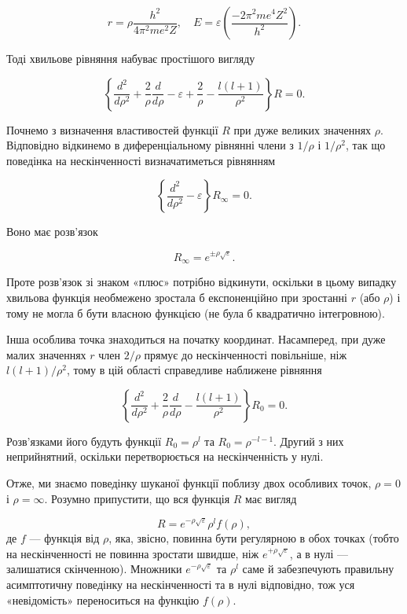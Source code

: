\documentclass{article}
\begin{document}
\begin{equation}
    r = \rho \frac{h^2}{4\pi^2 me^2 Z}, \quad E = \varepsilon \left( \frac{-2\pi^2 me^4 Z^2}{h^2} \right).
\end{equation}

Тоді хвильове рівняння набуває простішого вигляду

\begin{equation}
\left\{ \frac{d^2}{d\rho^2} + \frac{2}{\rho} \frac{d}{d\rho} - \varepsilon + \frac{2}{\rho} - \frac{l(l+1)}{\rho^2} \right\} R = 0.
\end{equation}

Почнемо з визначення властивостей функції $R$ при дуже великих значеннях $\rho$. Відповідно відкинемо в диференціальному рівнянні члени з $1/\rho$ і $1/\rho^2$, так що поведінка на нескінченності визначатиметься рівнянням

\begin{equation}
\left\{ \frac{d^2}{d\rho^2} - \varepsilon \right\} R_\infty = 0.
\end{equation}

Воно має розв'язок

\begin{equation}
R_\infty = e^{\pm \rho \sqrt{\varepsilon}}.
\end{equation}

Проте розв'язок зі знаком «плюс» потрібно відкинути, оскільки в цьому випадку хвильова функція необмежено зростала б експоненційно при зростанні $r$ (або $\rho$) і тому не могла б бути власною функцією (не була б квадратично інтегровною).

Інша особлива точка знаходиться на початку координат. Насамперед, при дуже малих значеннях $r$ член $2/\rho$ прямує до нескінченності повільніше, ніж $l(l+1)/\rho^2$, тому в цій області справедливе наближене рівняння

\begin{equation}
\left\{ \frac{d^2}{d\rho^2} + \frac{2}{\rho} \frac{d}{d\rho} - \frac{l(l+1)}{\rho^2} \right\} R_0 = 0.
\end{equation}

Розв'язками його будуть функції $R_0 = \rho^l$ та $R_0 = \rho^{-l-1}$. Другий з них неприйнятний, оскільки перетворюється на нескінченність у нулі.

Отже, ми знаємо поведінку шуканої функції поблизу двох особливих точок, $\rho = 0$ і $\rho = \infty$. Розумно припустити, що вся функція $R$ має вигляд

\begin{equation}
R = e^{-\rho \sqrt{\varepsilon}} \rho^l f(\rho),
\end{equation}
%
де $f$ --- функція від $\rho$, яка, звісно, повинна бути регулярною в обох точках (тобто на нескінченності не повинна зростати швидше, ніж $e^{+\rho \sqrt{\varepsilon}}$, а в нулі --- залишатися скінченною). Множники $e^{-\rho\sqrt\varepsilon}$ та $\rho^l$ саме й забезпечують правильну асимптотичну поведінку на нескінченності та в нулі відповідно, тож уся «невідомість» переноситься на функцію $f(\rho)$.
\end{document}

